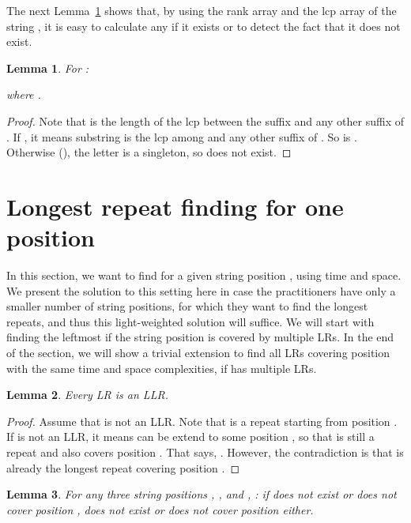 \documentclass[preprint]{elsarticle}
\newtheorem{lemma}{Lemma}[section]
\begin{document}
The next Lemma~\ref{lem:llr} shows that, by using the rank array and
the lcp array of the string , it is easy to calculate any  if
it exists or to detect the fact that it does not exist. 




\begin{lemma}
\label{lem:llr}
For : 

where .
\end{lemma}

\begin{proof}
  Note that  is the length of the lcp between the suffix
   and any other suffix of .  If , it means
  substring  is the lcp among  and any
  other suffix of . So  is .  Otherwise
  (), the letter  is a singleton, so  does not
  exist.
\end{proof}



\section{Longest repeat finding for one position}   
\label{sec:one}
In this section, we want to find  for a given string position
, using  time and space.  We present the solution to this
setting
here in 
case the practitioners have only a smaller number of 
string positions, for which they want to find the longest repeats, 
and thus this light-weighted solution will suffice.
We will start with finding the leftmost  if the string position
 is covered by multiple LRs. In the end of the section, we will
show a trivial extension to find all LRs covering position  with
the same time and space complexities, if  has multiple LRs.

\begin{lemma}
\label{lem:lr-llr}
Every LR is an LLR.
\end{lemma}

\begin{proof}
Assume that  is not an LLR. Note that  is a repeat starting from position . If  is not
an LLR, it means  can be extend to some position
, so that  is still a repeat and  also covers
position . That says, .
However, the contradiction is that  is already the longest repeat
covering position . 
\end{proof}

\begin{lemma}
\label{lem:llr-cover}
For any three string positions , , and , : if
 does not exist or does not cover position ,  does
not exist or does not cover position  either.
\end{lemma}
\end{document}
